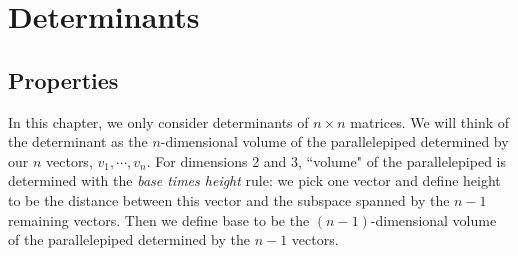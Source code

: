 \chapter{Determinants} 
\section{Properties}
In this chapter, we only consider determinants of $n \times n$ matrices. We will think of the determinant as the $n$-dimensional volume of the parallelepiped determined by our $n$ vectors, $v_{1}, \cdots, v_{n}$. For dimensions 2 and 3, ``volume" of the parallelepiped is determined with the \textit{base times height} rule: we pick one vector and define height to be the distance between this vector and the subspace spanned by the $n - 1$ remaining vectors. Then we define base to be the $(n-1)$-dimensional volume of the parallelepiped determined by the $n-1$ vectors. 

